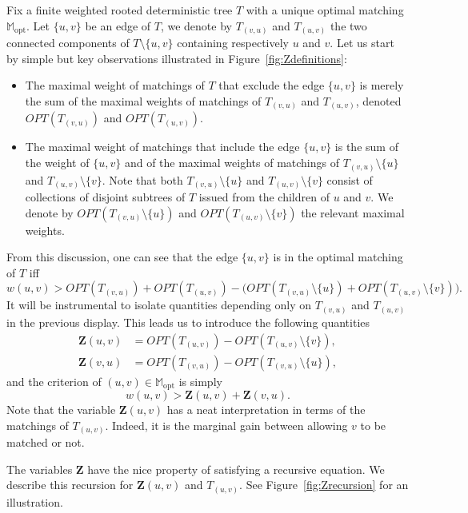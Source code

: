\documentclass[11pt]{article}
\begin{document}
Fix a finite weighted rooted deterministic tree $T$ with a unique optimal matching $\mathbb{M}_{\mathrm{opt}}$. Let $\{u,v\}$ be an edge of $T$, we denote by $T_{(v,u)}$ and $T_{(u,v)}$ the two connected components of $T \setminus \{u,v\}$ containing respectively $u$ and $v$. Let us start by simple but key observations illustrated in Figure~\ref{fig:Zdefinitions}:
\begin{itemize}
    \item The maximal weight of matchings of $T$ that exclude the edge $\{u,v \}$ is merely the sum of the maximal weights of matchings of $T_{(v,u)}$ and $T_{(u,v)}$, denoted $OPT(T_{(v,u)})$ and $OPT(T_{(u,v)})$.
    \item The maximal weight of matchings that include the edge $\{u,v\}$ is the sum of the weight of $\{u,v\}$ and of the maximal weights of matchings of $T_{(v,u)} \setminus \{ u \} $ and $T_{(u,v)} \setminus \{ v \}$. Note that both $T_{(v,u)} \setminus \{ u \} $ and $T_{(u,v)} \setminus \{ v \}$ consist of collections of disjoint subtrees of $T$ issued from the children of $u$ and $v$. We denote by $OPT(T_{(v,u)} \setminus \{ u\})$ and $OPT(T_{(u,v)} \setminus \{ v \})$ the relevant maximal weights.
\end{itemize}
From this discussion, one can see that the edge $\{ u,v \}$ is in the optimal matching of $T$ iff
\[
w(u,v) > OPT(T_{(v,u)}) + OPT(T_{(u,v)}) - \Big(OPT(T_{(v,u)} \setminus \{u\}) + OPT(T_{(u,v)} \setminus \{v\}) \Big).
\]
It will be instrumental to isolate quantities depending only on $T_{(v,u)}$ and $T_{(u,v)}$ in the previous display. This leads us to introduce the following quantities
\begin{align*}
\mathbf{Z}(u,v)&= OPT( T_{(u,v)})-OPT(T_{(u,v)} \setminus \{v\}), \\
\mathbf{Z}(v,u)&=OPT(T_{(v,u)} )- OPT( T_{(v,u)} \setminus \{u\}), 
\end{align*}
and the criterion of $(u,v) \in \mathbb{M}_{\mathrm{opt}}$ is simply 
\begin{equation}\label{eq:defmatching}
 w(u,v)> \mathbf{Z}(u,v)+\mathbf{Z}(v,u) .
\end{equation}
Note that the variable $\mathbf{Z}(u,v)$ has a neat interpretation  in terms of the matchings of $T_{(u,v)}$. Indeed, it is the marginal gain between allowing $v$ to be matched or not.




\bigskip



The variables $\mathbf{Z}$ have the nice property of satisfying a recursive equation. We describe this recursion for $\mathbf{Z}(u,v)$ and $T_{(u,v)}$. See Figure~\ref{fig:Zrecursion} for an illustration.
\end{document}
